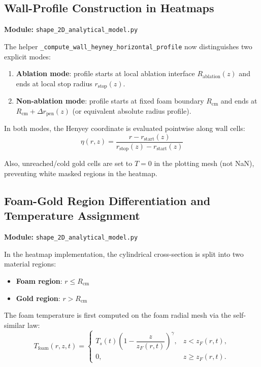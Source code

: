 \documentclass[12pt,a4paper]{article}
\begin{document}
\subsection{Wall-Profile Construction in Heatmaps}

\textbf{Module:} \texttt{shape\_2D\_analytical\_model.py}

The helper \texttt{\_compute\_wall\_heyney\_horizontal\_profile} now distinguishes two explicit modes:
\begin{enumerate}
    \item \textbf{Ablation mode}: profile starts at local ablation interface $R_{\text{ablation}}(z)$ and ends at local stop radius $r_{\text{stop}}(z)$.
    \item \textbf{Non-ablation mode}: profile starts at fixed foam boundary $R_{\mathrm{cm}}$ and ends at $R_{\mathrm{cm}} + \Delta r_{\text{pen}}(z)$ (or equivalent absolute radius profile).
\end{enumerate}

In both modes, the Henyey coordinate is evaluated pointwise along wall cells:
\begin{equation}
\eta(r,z) = \frac{r-r_{\text{start}}(z)}{r_{\text{stop}}(z)-r_{\text{start}}(z)}
\end{equation}

Also, unreached/cold gold cells are set to $T=0$ in the plotting mesh (not NaN), preventing white masked regions in the heatmap.

\subsection{Foam-Gold Region Differentiation and Temperature Assignment}

\textbf{Module:} \texttt{shape\_2D\_analytical\_model.py}

In the heatmap implementation, the cylindrical cross-section is split into two material regions:
\begin{itemize}
    \item \textbf{Foam region}: $r \leq R_{\mathrm{cm}}$
    \item \textbf{Gold region}: $r > R_{\mathrm{cm}}$
\end{itemize}

The foam temperature is first computed on the foam radial mesh via the self-similar law:
\begin{equation}
T_{\mathrm{foam}}(r,z,t) =
\begin{cases}
T_s(t)\left(1-\dfrac{z}{z_F(r,t)}\right)^{\gamma}, & z<z_F(r,t), \\
0, & z\ge z_F(r,t).
\end{cases}
\end{equation}
\end{document}
